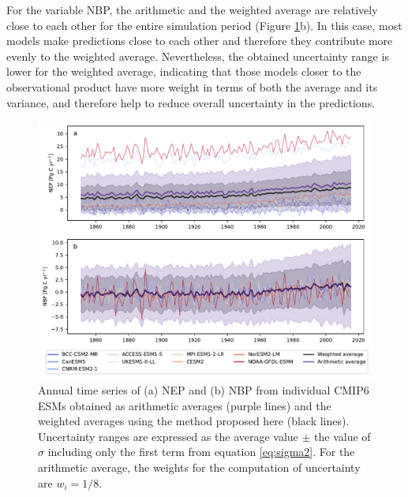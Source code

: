 \documentclass[gmd, manuscript]{copernicus}
\begin{document}
For the variable NBP, the arithmetic and the weighted average are relatively close to each other for the entire simulation period (Figure \ref{fig:averages}b). In this case, most models make predictions close to each other and therefore they contribute more evenly to the weighted average. Nevertheless, the obtained uncertainty range is lower for the weighted average, indicating that those models closer to the observational product have more weight in terms of both the average and its variance, and therefore help to reduce overall uncertainty in the predictions. 


\begin{figure}[t]
   \centering
   \includegraphics[width=14cm]{Figures/Time_series_NXP_c1.pdf} %
   \caption{Annual time series of (a) NEP and (b) NBP from individual CMIP6 ESMs obtained as arithmetic averages (purple lines) and the weighted averages using the method proposed here (black lines). Uncertainty ranges are expressed as the average value $\pm$ the value of $\sigma$ including only the first term from equation \ref{eq:sigma2}. For the arithmetic average, the weights for the computation of uncertainty are $w_i = 1/8$.}
   \label{fig:averages}
\end{figure}
\end{document}
